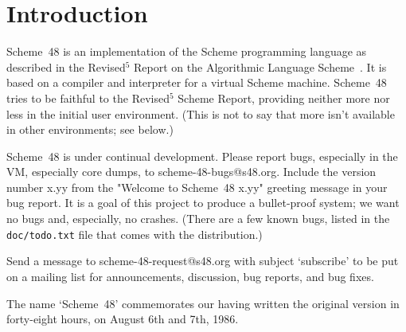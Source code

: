 

\chapter{Introduction}

Scheme~48 is an implementation of the Scheme programming language as
described in the Revised$^5$ Report on the Algorithmic Language
 Scheme~\cite{R5RS}.
It is based on a compiler and interpreter for a virtual Scheme
machine.  Scheme~48 tries to be faithful to the Revised$^5$ Scheme
Report, providing neither more nor less in the initial user
environment.  (This is not to say that more isn't available in other
environments; see below.)

Scheme~48 is under continual development.
Please report bugs, especially in the VM, especially core dumps, to
scheme-48-bugs@s48.org.  Include the version number x.yy
from the "Welcome to Scheme~48 x.yy" greeting message in your bug
report.  It is a goal of this project to produce a bullet-proof
system; we want no bugs and, especially, no crashes.  (There are a few
known bugs, listed in the {\tt doc/todo.txt} file that comes with the
distribution.)

Send a message to scheme-48-request@s48.org with subject `subscribe' to
 be put on a
mailing list for announcements, discussion, bug reports, and bug
fixes.

The name `Scheme~48' commemorates our having written the original version
 in forty-eight hours, on August 6th and 7th, 1986.


